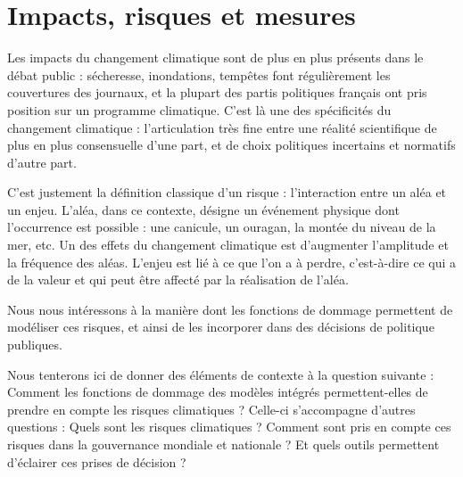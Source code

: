 \chapter{Impacts, risques et mesures}
\label{chapter:introduction}
\newrefsegment


\newpage


Les impacts du changement climatique sont de plus en plus présents dans le débat public : sécheresse, inondations, tempêtes font régulièrement les couvertures des journaux, et la plupart des partis politiques français ont pris position sur un programme climatique. C'est là une des spécificités du changement climatique : l'articulation très fine entre une réalité scientifique de plus en plus consensuelle d'une part, et de choix politiques incertains et normatifs d'autre part. 


C'est justement la définition classique d'un risque : l'interaction entre un aléa et un enjeu. L'aléa, dans ce contexte, désigne un événement physique dont l'occurrence est possible : une canicule, un ouragan, la montée du niveau de la mer, etc. Un des effets du changement climatique est d'augmenter l'amplitude et la fréquence des aléas. L'enjeu est lié à ce que l'on a à perdre, c'est-à-dire ce qui a de la valeur et qui peut être affecté par la réalisation de l'aléa. 

Nous nous intéressons à la manière dont les fonctions de dommage permettent de modéliser ces risques, et ainsi de les incorporer dans des décisions de politique publiques. 



Nous tenterons ici de donner des éléments de contexte à la question suivante : 
Comment les fonctions de dommage des modèles intégrés permettent-elles de prendre en compte les risques climatiques ? Celle-ci s'accompagne d'autres questions : Quels sont les risques climatiques ? Comment sont pris en compte ces risques dans la gouvernance mondiale et nationale ? Et quels outils permettent d'éclairer ces prises de décision ? 



